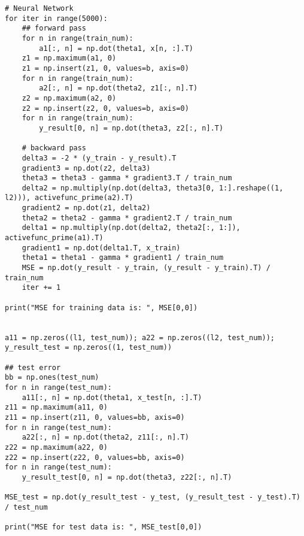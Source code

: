 \documentclass[letterpaper,11pt]{article}
\begin{document}
\begin{spacing}{1.2}
\begin{lstlisting}
# Neural Network
for iter in range(5000):
    ## forward pass
    for n in range(train_num):
        a1[:, n] = np.dot(theta1, x[n, :].T)
    z1 = np.maximum(a1, 0)
    z1 = np.insert(z1, 0, values=b, axis=0)
    for n in range(train_num):
        a2[:, n] = np.dot(theta2, z1[:, n].T)
    z2 = np.maximum(a2, 0)
    z2 = np.insert(z2, 0, values=b, axis=0)
    for n in range(train_num):
        y_result[0, n] = np.dot(theta3, z2[:, n].T)

    # backward pass
    delta3 = -2 * (y_train - y_result).T
    gradient3 = np.dot(z2, delta3)
    theta3 = theta3 - gamma * gradient3.T / train_num
    delta2 = np.multiply(np.dot(delta3, theta3[0, 1:].reshape((1, l2))), activefunc_prime(a2).T)
    gradient2 = np.dot(z1, delta2)
    theta2 = theta2 - gamma * gradient2.T / train_num
    delta1 = np.multiply(np.dot(delta2, theta2[:, 1:]), activefunc_prime(a1).T)
    gradient1 = np.dot(delta1.T, x_train)
    theta1 = theta1 - gamma * gradient1 / train_num
    MSE = np.dot(y_result - y_train, (y_result - y_train).T) / train_num
    iter += 1

print("MSE for training data is: ", MSE[0,0])


a11 = np.zeros((l1, test_num)); a22 = np.zeros((l2, test_num)); y_result_test = np.zeros((1, test_num))

## test error
bb = np.ones(test_num)
for n in range(test_num):
    a11[:, n] = np.dot(theta1, x_test[n, :].T)
z11 = np.maximum(a11, 0)
z11 = np.insert(z11, 0, values=bb, axis=0)
for n in range(test_num):
    a22[:, n] = np.dot(theta2, z11[:, n].T)
z22 = np.maximum(a22, 0)
z22 = np.insert(z22, 0, values=bb, axis=0)
for n in range(test_num):
    y_result_test[0, n] = np.dot(theta3, z22[:, n].T)

MSE_test = np.dot(y_result_test - y_test, (y_result_test - y_test).T) / test_num

print("MSE for test data is: ", MSE_test[0,0])
\end{lstlisting}

\begin{lstlisting}
\end{lstlisting}
\end{spacing}
\end{document}
